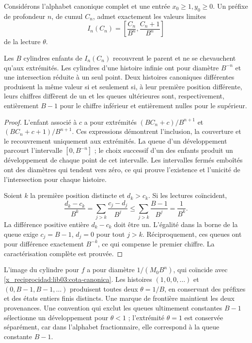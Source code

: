 Considérons l'alphabet canonique complet et une entrée \(x_0\geq1,y_0\geq0\). Un préfixe de profondeur \(n\), de cumul \(C_n\), admet exactement les valeurs limites
\begin{equation}
 I_n(C_n)=\left[\frac{C_n}{B^n},\frac{C_n+1}{B^n}\right]
 \label{x_reciprocidad:lib03:cilindro}
\end{equation}
de la lecture \(\theta\).

\begin{theorem}
\label{x_reciprocidad:lib03:teo-cilindros}
Les \(B\) cylindres enfants de \(I_n(C_n)\) recouvrent le parent et ne se
chevauchent qu’aux extrémités. Les cylindres d’une histoire infinie
ont pour diamètre \(B^{-n}\) et une intersection réduite à un seul point.
Deux histoires canoniques différentes produisent la même valeur si et seulement
si, à leur première position différente, leurs chiffres diffèrent de un et les
queues ultérieures sont, respectivement, entièrement \(B-1\) pour le chiffre
inférieur et entièrement nulles pour le supérieur.
\end{theorem}

\begin{proof}
L'enfant associé à \(c\) a pour extrémités \((BC_n+c)/B^{n+1}\) et \((BC_n+c+1)/B^{n+1}\). Ces expressions démontrent l'inclusion, la couverture et le recouvrement uniquement aux extrémités. La queue d'un développement parcourt l'intervalle \([0,B^{-n}]\) ; le choix successif d'un des enfants produit un développement de chaque point de cet intervalle. Les intervalles fermés emboîtés ont des diamètres qui tendent vers zéro, ce qui prouve l'existence et l'unicité de l'intersection pour chaque histoire.

Soient \(k\) la première position distincte et \(d_k>c_k\). Si les
lectures coïncident,
\[
 \frac{d_k-c_k}{B^k}
 =\sum_{j>k}\frac{c_j-d_j}{B^j}
 \leq\sum_{j>k}\frac{B-1}{B^j}=\frac1{B^k}.
\]
La différence positive entière \(d_k-c_k\) doit être un. L’égalité
dans la borne de la queue exige \(c_j=B-1\), \(d_j=0\) pour tout
\(j>k\). Réciproquement, ces queues ont pour différence exactement
\(B^{-k}\), ce qui compense le premier chiffre. La
caractérisation complète est prouvée.
\end{proof}

L’image du cylindre pour \(f\) a pour diamètre
\(1/(M_0B^n)\), qui coïncide avec \eqref{x_reciprocidad:lib03:cota-canonica}.
Les histoires \((1,0,0,\ldots)\) et
\((0,B-1,B-1,\ldots)\) produisent toutes deux \(\theta=1/B\), en conservant
des préfixes et des états entiers finis distincts. Une marque de frontière
maintient les deux provenances. Une convention qui exclut les queues ultimement
constantes \(B-1\) sélectionne un développement pour \(\theta<1\) ;
l’extrémité \(\theta=1\) est conservée séparément, car dans
l’alphabet fractionnaire, elle correspond à la queue constante \(B-1\).


